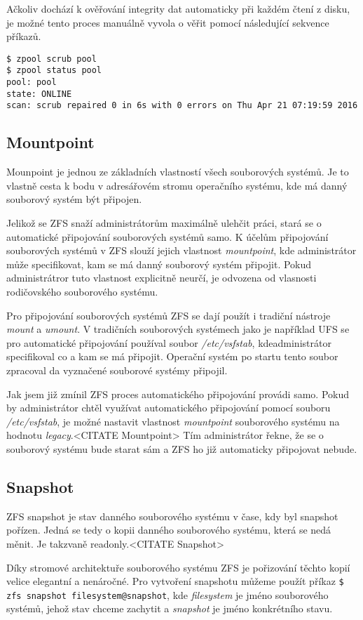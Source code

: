 Ačkoliv dochází k ověřování integrity dat automaticky při každém čtení z disku, je možné tento proces manuálně vyvola o věřit pomocí následující sekvence příkazů.
\begin{verbatim}
$ zpool scrub pool
$ zpool status pool
pool: pool
state: ONLINE
scan: scrub repaired 0 in 6s with 0 errors on Thu Apr 21 07:19:59 2016
\end{verbatim}

\subsection{Mountpoint}
\label{mountpoint}
Mounpoint je jednou ze základních vlastností všech souborových systémů. Je to vlastně cesta k bodu v adresářovém stromu operačního systému, kde má danný souborový systém být připojen.

Jelikož se ZFS snaží administrátorům maximálně ulehčit práci, stará se o automatické připojování souborových systémů samo. K účelům připojování souborových systémů v ZFS slouží jejich vlastnost \emph{mountpoint}, kde administrátor může specifikovat, kam se má danný souborový systém připojit. Pokud administrátror tuto vlastnost explicitně neurčí, je odvozena od vlasnosti rodičovského souborového systému.

Pro připojování souborových systémů ZFS se dají použít i tradiční nástroje \emph{mount} a \emph{umount}. V tradičních souborových systémech jako je například UFS se pro automatické připojování používal soubor \emph{/etc/vsfstab}, kdeadministrátor specifikoval co a kam se má připojit. Operační systém po startu tento soubor zpracoval da vyznačené souborové systémy připojil.

Jak jsem již zmínil ZFS proces automatického připojování provádi samo. Pokud by administrátor chtěl využívat automatického připojování pomocí souboru \emph{/etc/vsfstab}, je možné nastavit vlastnost \emph{mountpoint} souborového systému na hodnotu \emph{legacy}.<CITATE Mountpoint> Tím administrátor řekne, že se o souborový systému bude starat sám a ZFS ho již automaticky připojovat nebude.
\subsection{Snapshot}
\label{snapshot}
ZFS snapshot je stav danného souborového systému v čase, kdy byl snapshot pořízen. Jedná se tedy o kopii danného souborového systému, která se nedá měnit. Je takzvaně readonly.<CITATE Snapshot>

Díky stromové architektuře souborového systému ZFS je pořizování těchto kopií velice elegantní a nenáročné. Pro vytvoření snapshotu můžeme použít příkaz \verb|$ zfs snapshot filesystem@snapshot|, kde \emph{filesystem} je jméno souborového systémů, jehož stav chceme zachytit a \emph{snapshot} je jméno konkrétního stavu.

